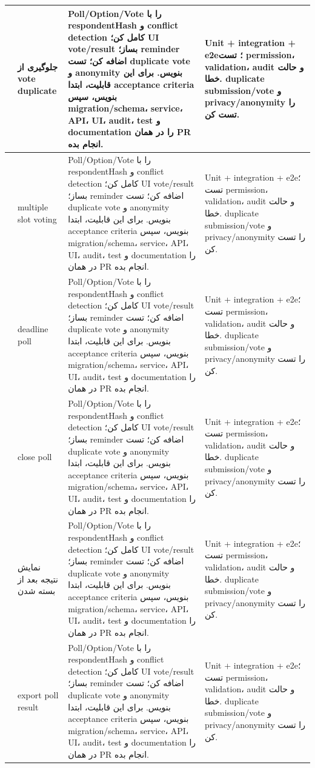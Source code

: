 \documentclass[11pt,a4paper]{article}
\begin{document}
\begin{longtable}{|>{\raggedleft\arraybackslash}p{}|>{\raggedleft\arraybackslash}p{}|>{\raggedleft\arraybackslash}p{}|>{\raggedleft\arraybackslash}p{}|}
186 & جلوگیری از vote duplicate & Poll/Option/Vote را با respondentHash و conflict detection کامل کن؛ UI vote/result بساز؛ reminder اضافه کن؛ تست duplicate vote و anonymity بنویس. برای این قابلیت، ابتدا acceptance criteria بنویس، سپس migration/schema، service، API، UI، audit، test و documentation را در همان PR انجام بده. & Unit + integration + e2e؛ تست permission، validation، audit و حالت خطا. duplicate submission/vote و privacy/anonymity را تست کن. \\ \hline
187 & multiple slot voting & Poll/Option/Vote را با respondentHash و conflict detection کامل کن؛ UI vote/result بساز؛ reminder اضافه کن؛ تست duplicate vote و anonymity بنویس. برای این قابلیت، ابتدا acceptance criteria بنویس، سپس migration/schema، service، API، UI، audit، test و documentation را در همان PR انجام بده. & Unit + integration + e2e؛ تست permission، validation، audit و حالت خطا. duplicate submission/vote و privacy/anonymity را تست کن. \\ \hline
188 & deadline poll & Poll/Option/Vote را با respondentHash و conflict detection کامل کن؛ UI vote/result بساز؛ reminder اضافه کن؛ تست duplicate vote و anonymity بنویس. برای این قابلیت، ابتدا acceptance criteria بنویس، سپس migration/schema، service، API، UI، audit، test و documentation را در همان PR انجام بده. & Unit + integration + e2e؛ تست permission، validation، audit و حالت خطا. duplicate submission/vote و privacy/anonymity را تست کن. \\ \hline
189 & close poll & Poll/Option/Vote را با respondentHash و conflict detection کامل کن؛ UI vote/result بساز؛ reminder اضافه کن؛ تست duplicate vote و anonymity بنویس. برای این قابلیت، ابتدا acceptance criteria بنویس، سپس migration/schema، service، API، UI، audit، test و documentation را در همان PR انجام بده. & Unit + integration + e2e؛ تست permission، validation، audit و حالت خطا. duplicate submission/vote و privacy/anonymity را تست کن. \\ \hline
190 & نمایش نتیجه بعد از بسته شدن & Poll/Option/Vote را با respondentHash و conflict detection کامل کن؛ UI vote/result بساز؛ reminder اضافه کن؛ تست duplicate vote و anonymity بنویس. برای این قابلیت، ابتدا acceptance criteria بنویس، سپس migration/schema، service، API، UI، audit، test و documentation را در همان PR انجام بده. & Unit + integration + e2e؛ تست permission، validation، audit و حالت خطا. duplicate submission/vote و privacy/anonymity را تست کن. \\ \hline
191 & export poll result & Poll/Option/Vote را با respondentHash و conflict detection کامل کن؛ UI vote/result بساز؛ reminder اضافه کن؛ تست duplicate vote و anonymity بنویس. برای این قابلیت، ابتدا acceptance criteria بنویس، سپس migration/schema، service، API، UI، audit، test و documentation را در همان PR انجام بده. & Unit + integration + e2e؛ تست permission، validation، audit و حالت خطا. duplicate submission/vote و privacy/anonymity را تست کن. \\ \hline

\end{longtable}
\end{document}
